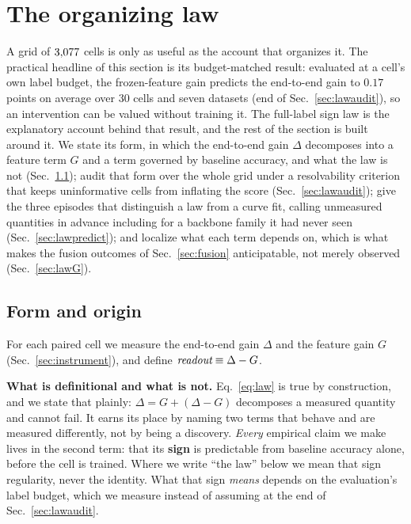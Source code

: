 \section{The organizing law}\label{sec:law}

 A grid of $3{,}077$ cells is only as useful as the account that organizes
it. The practical headline of this section is its budget-matched result:
evaluated at a cell's own label budget, the frozen-feature gain predicts the
end-to-end gain to $0.17$ points on average over 30 cells and seven datasets
(end of Sec.~\ref{sec:lawaudit}), so an intervention can be valued without
training it. The full-label sign law is the explanatory account behind that
result, and the rest of the section is built around it. We state its form, in
which the end-to-end gain $\Delta$
decomposes into a feature term $G$ and a \readout{} term governed by baseline
accuracy, and what the law is not (Sec.~\ref{sec:lawform}); audit that
form over the whole grid under a resolvability criterion that keeps
uninformative cells from inflating the score (Sec.~\ref{sec:lawaudit});
give the three episodes that distinguish a law from a curve fit, calling
unmeasured quantities in advance including for a backbone family it had never
seen (Sec.~\ref{sec:lawpredict}); and localize what each term depends on,
which is what makes the fusion outcomes of Sec.~\ref{sec:fusion}
anticipatable, not merely observed (Sec.~\ref{sec:lawG}).

\subsection{Form and origin}\label{sec:lawform}
For each paired cell we measure the end-to-end gain $\Delta$ and the feature
gain $G$ (Sec.~\ref{sec:instrument}), and define $\textit{readout} \equiv
\Delta - G$.

\textbf{What is definitional and what is not.} Eq.~\ref{eq:law} is true by
construction, and we state that plainly: $\Delta = G + (\Delta - G)$
decomposes a measured quantity and cannot fail. It earns its place by naming
two terms that behave and are measured differently, not by
being a discovery. \emph{Every} empirical claim we make lives in the second
term: that its \textbf{sign} is predictable from baseline accuracy alone,
before the cell is trained. Where we write ``the law'' below we mean that sign
regularity, never the identity. What that sign \emph{means} depends on the
evaluation's label budget, which we measure instead of assuming at the end of
Sec.~\ref{sec:lawaudit}.

